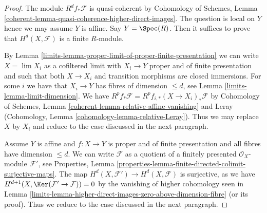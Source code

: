 \begin{proof}

The module $R^df_*\mathcal{F}$ is quasi-coherent by
Cohomology of Schemes, Lemma
\ref{coherent-lemma-quasi-coherence-higher-direct-images}.
The question is local on $Y$ hence we may assume $Y$ is affine.
Say $Y = \Spec(R)$. Then it suffices to prove that $H^d(X, \mathcal{F})$
is a finite $R$-module.

\medskip\noindent
By Lemma \ref{limits-lemma-proper-limit-of-proper-finite-presentation}
we can write $X = \lim X_i$ as a cofiltered limit with $X_i \to Y$ proper
and of finite presentation and such that both $X \to X_i$
and transition morphisms are closed immersions.
For some $i$ we have that $X_i \to Y$ has fibres of dimension $\leq d$,
see Lemma \ref{limits-lemma-limit-dimension}. We have
$R^pf_*\mathcal{F} = R^pf_{i, *}(X \to X_i)_*\mathcal{F}$ by
Cohomology of Schemes, Lemma \ref{coherent-lemma-relative-affine-vanishing}
and Leray (Cohomology, Lemma \ref{cohomology-lemma-relative-Leray}).
Thus we may replace $X$ by $X_i$ and
reduce to the case discussed in the next paragraph.

\medskip\noindent
Assume $Y$ is affine and $f : X \to Y$ is proper and of finite presentation
and all fibres have dimension $\leq d$.
We can write $\mathcal{F}$ as a quotient of a finitely presented
$\mathcal{O}_X$-module $\mathcal{F}'$, see
Properties, Lemma
\ref{properties-lemma-finite-directed-colimit-surjective-maps}.
The map $H^d(X, \mathcal{F}') \to H^d(X, \mathcal{F})$ is
surjective, as we have $H^{d + 1}(X, \Ker(\mathcal{F}' \to \mathcal{F})) = 0$
by the vanishing of higher cohomology seen in
Lemma \ref{limits-lemma-higher-direct-images-zero-above-dimension-fibre}
(or its proof). Thus we reduce to the case discussed in the next paragraph.


\end{proof}
